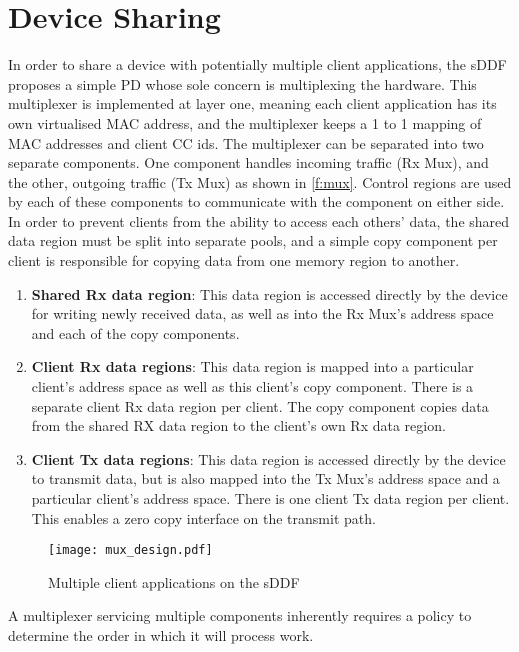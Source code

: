 \section{Device Sharing}\label{s:mux_design}
In order to share a device with potentially multiple client applications, the sDDF proposes a simple PD whose 
sole concern is multiplexing the hardware. This multiplexer is implemented at layer one, meaning each client application has its
own virtualised MAC address, and the multiplexer keeps a 1 to 1 mapping of MAC addresses and client CC ids. The multiplexer
can be separated into two separate components. One component handles incoming traffic (Rx Mux), and the other, outgoing traffic
(Tx Mux) as shown in \autoref{f:mux}. Control regions are used by each of these components to communicate with the component on 
either side.
In order to prevent clients from the ability to access each others' data, the shared data region must be split into
separate pools, and a simple copy component per client is responsible for copying data from one memory region to another.
\begin{enumerate}
\item \textbf{Shared Rx data region}: This data region is accessed directly by the device for writing newly received data, as well
as into the Rx Mux's address space and each of the copy components.
\item \textbf{Client Rx data regions}: This data region is mapped into a particular client's address space as well as this
client's copy component. There is a separate client Rx data region per client. The copy component copies data from the 
shared RX data region to the client's own Rx data region.
\item \textbf{Client Tx data regions}: This data region is accessed directly by the device to transmit data, but is also mapped into
the Tx Mux's address space and a particular client's address space. There is one client Tx data region per client. This
enables a zero copy interface on the transmit path.
\end{enumerate}

\begin{figure}[h]
    \centering
    \texttt{[image: mux\_design.pdf]}
    \caption{Multiple client applications on the sDDF}
    \label{f:mux}
\end{figure}

A multiplexer servicing multiple components inherently requires a policy to determine the order in which it will process work.

